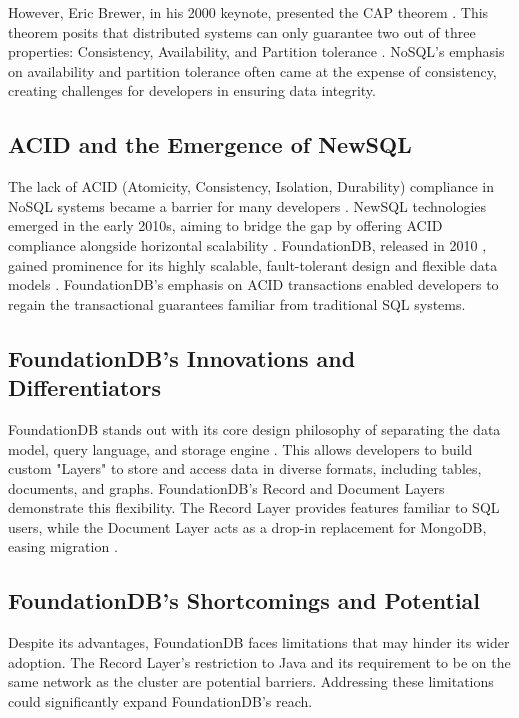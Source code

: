 \documentclass[sigconf]{acmart}
\begin{document}
However, Eric Brewer, in his 2000 keynote, presented the CAP theorem \cite{Brewer,Browne_2009}. This theorem posits that distributed systems can only guarantee two out of three properties: Consistency, Availability, and Partition tolerance \cite{BrewerSupport}. NoSQL's emphasis on availability and partition tolerance often came at the expense of consistency, creating challenges for developers in ensuring data integrity.

\subsection{ACID and the Emergence of NewSQL}

The lack of ACID (Atomicity, Consistency, Isolation, Durability) compliance in NoSQL systems became a barrier for many developers \cite{NewSQL}. NewSQL technologies emerged in the early 2010s, aiming to bridge the gap by offering ACID compliance alongside horizontal scalability \cite{NewSQL}. FoundationDB, released in 2010 \cite{FoundationDBCreation}, gained prominence for its highly scalable, fault-tolerant design and flexible data models \cite{FoundationDBPaper,Snowflake}. FoundationDB's emphasis on ACID transactions enabled developers to regain the transactional guarantees familiar from traditional SQL systems.

\subsection{FoundationDB's Innovations and Differentiators}

FoundationDB stands out with its core design philosophy of separating the data model, query language, and storage engine \cite{FoundationDBPaper}. This allows developers to build custom "Layers" to store and access data in diverse formats, including tables, documents, and graphs. FoundationDB's Record and Document Layers demonstrate this flexibility. The Record Layer provides features familiar to SQL users, while the Document Layer acts as a drop-in replacement for MongoDB, easing migration \cite{FDBDocumentGithub}.

\subsection{FoundationDB's Shortcomings and Potential}

Despite its advantages, FoundationDB faces limitations that may hinder its wider adoption. The Record Layer's restriction to Java and its requirement to be on the same network as the cluster are potential barriers. Addressing these limitations could significantly expand FoundationDB's reach.
\end{document}
